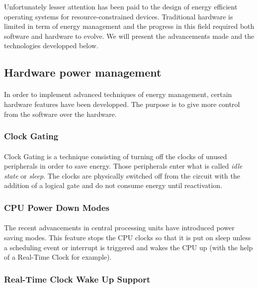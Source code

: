Unfortunately lesser attention has been paid to the design of energy efficient operating systems for resource-constrained devices.
Traditional hardware is limited in term of energy management and the progress in this field required both software and hardware to evolve.
We will present the advancements made and the technologies developped below.


\subsection{Hardware power management}
\paragraph{}
In order to implement advanced techniques of energy management, certain hardware features have been developped.
The purpose is to give more control from the software over the hardware.

\subsubsection{Clock Gating}
\paragraph{}
Clock Gating is a technique consisting of turning off the clocks of unused peripherals in order to save energy.
Those peripherals enter what is called \textit{idle state} or \textit{sleep}.
The clocks are physically switched off from the circuit with the addition of a logical gate and do not consume energy until reactivation.

\subsubsection{CPU Power Down Modes}
\paragraph{}
The recent advancements in central processing units have introduced power saving modes.
This feature stops the CPU clocks so that it is put on sleep unless
    a scheduling event or interrupt is triggered and wakes the CPU up (with the help of a Real-Time Clock for example).

\subsubsection{Real-Time Clock Wake Up Support}
